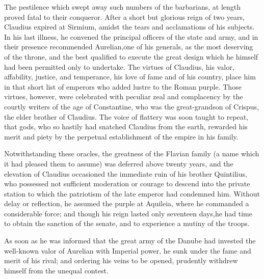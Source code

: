 The pestilence which swept away such numbers of the barbarians,
at length proved fatal to their conqueror. After a short but
glorious reign of two years, Claudius expired at Sirmium, amidst
the tears and acclamations of his subjects. In his last illness,
he convened the principal officers of the state and army, and in
their presence recommended Aurelian,\footnotemark[14] one of his generals, as
the most deserving of the throne, and the best qualified to
execute the great design which he himself had been permitted only
to undertake. The virtues of Claudius, his valor, affability,
justice, and temperance, his love of fame and of his country,
place him in that short list of emperors who added lustre to the
Roman purple. Those virtues, however, were celebrated with
peculiar zeal and complacency by the courtly writers of the age
of Constantine, who was the great-grandson of Crispus, the elder
brother of Claudius. The voice of flattery was soon taught to
repeat, that gods, who so hastily had snatched Claudius from the
earth, rewarded his merit and piety by the perpetual
establishment of the empire in his family.\footnotemark[15]



Notwithstanding these oracles, the greatness of the Flavian
family (a name which it had pleased them to assume) was deferred
above twenty years, and the elevation of Claudius occasioned the
immediate ruin of his brother Quintilius, who possessed not
sufficient moderation or courage to descend into the private
station to which the patriotism of the late emperor had condemned
him. Without delay or reflection, he assumed the purple at
Aquileia, where he commanded a considerable force; and though his
reign lasted only seventeen days,\footnotemark[151] he had time to obtain the
sanction of the senate, and to experience a mutiny of the troops.

As soon as he was informed that the great army of the Danube had
invested the well-known valor of Aurelian with Imperial power, he
sunk under the fame and merit of his rival; and ordering his
veins to be opened, prudently withdrew himself from the unequal
contest.\footnotemark[16]

